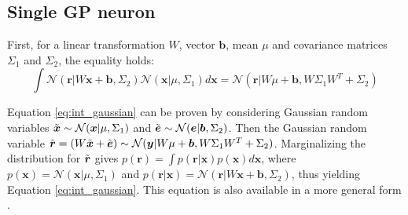 \documentclass{article}
\begin{document}
\subsection{Single GP neuron}
First, for a linear transformation $W$, vector $\boldsymbol{b}$, mean $\mu$ and covariance matrices $\Sigma_1$ and $\Sigma_2$, the equality holds:
\begin{equation}
    \int\mathcal{N}(\boldsymbol{r}|W\boldsymbol{x}+\boldsymbol{b},\Sigma_2)\mathcal{N}(\boldsymbol{x}|\mu,\Sigma_1)d\boldsymbol{x}=\mathcal{N}(\boldsymbol{r}|W\mu+\boldsymbol{b},W\Sigma_1W^T+\Sigma_2)
    \label{eq:int_gaussian}
\end{equation}

Equation \ref{eq:int_gaussian} can be proven by considering Gaussian random variables $\Tilde{\boldsymbol{x}}\sim\mathcal{N}(\boldsymbol{x}|\mu,\Sigma_1)$ and $\Tilde{\boldsymbol{e}}\sim\mathcal{N}(\boldsymbol{e}|\boldsymbol{b},\Sigma_2)$. Then the Gaussian random variable $\Tilde{\boldsymbol{r}}=(W\Tilde{\boldsymbol{x}}+\Tilde{\boldsymbol{e}})\sim\mathcal{N}(\boldsymbol{y}|W\mu+\boldsymbol{b},W\Sigma_1W^T+\Sigma_2)$. Marginalizing the distribution for $\Tilde{\boldsymbol{r}}$ gives $p(\boldsymbol{r})=\int p(\boldsymbol{r}|\boldsymbol{x})p(\boldsymbol{x})d\boldsymbol{x}$, where $p(\boldsymbol{x})=\mathcal{N}(\boldsymbol{x}|\mu,\Sigma_1)$ and $p(\boldsymbol{r}|\boldsymbol{x})=\mathcal{N}(\boldsymbol{r}|W\boldsymbol{x}+\boldsymbol{b},\Sigma_2)$, thus yielding Equation \ref{eq:int_gaussian}. This equation is also available in a more general form \cite{MatrixCookBook}.
\end{document}
